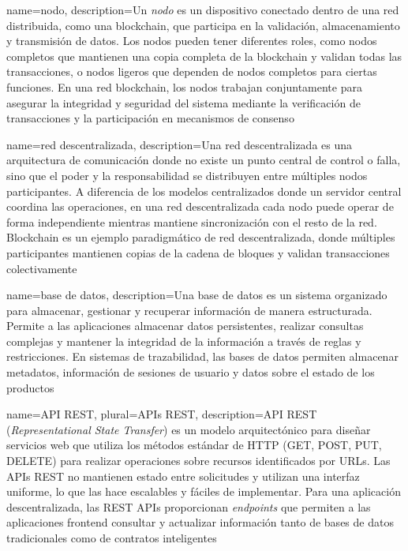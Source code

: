 {
    name=nodo,
    description={Un \textit{nodo} es un dispositivo conectado dentro de una red distribuida, como una blockchain, que participa en la validación, almacenamiento y transmisión de datos. Los nodos pueden tener diferentes roles, como nodos completos que mantienen una copia completa de la blockchain y validan todas las transacciones, o nodos ligeros que dependen de nodos completos para ciertas funciones. En una red blockchain, los nodos trabajan conjuntamente para asegurar la integridad y seguridad del sistema mediante la verificación de transacciones y la participación en mecanismos de consenso}
}

{
    name=red descentralizada,
    description={Una red descentralizada es una arquitectura de comunicación donde no existe un punto central de control o falla, sino que el poder y la responsabilidad se distribuyen entre múltiples nodos participantes. A diferencia de los modelos centralizados donde un servidor central coordina las operaciones, en una red descentralizada cada nodo puede operar de forma independiente mientras mantiene sincronización con el resto de la red. Blockchain es un ejemplo paradigmático de red descentralizada, donde múltiples participantes mantienen copias de la cadena de bloques y validan transacciones colectivamente}
}

{
    name=base de datos,
    description={Una base de datos es un sistema organizado para almacenar, gestionar y recuperar información de manera estructurada. Permite a las aplicaciones almacenar datos persistentes, realizar consultas complejas y mantener la integridad de la información a través de reglas y restricciones. En sistemas de trazabilidad, las bases de datos permiten almacenar metadatos, información de sesiones de usuario y datos sobre el estado de los productos}
}

{
    name=API REST,
    plural=APIs REST,
    description={API REST (\textit{Representational State Transfer}) es un modelo arquitectónico para diseñar servicios web que utiliza los métodos estándar de HTTP (GET, POST, PUT, DELETE) para realizar operaciones sobre recursos identificados por URLs. Las APIs REST no mantienen estado entre solicitudes y utilizan una interfaz uniforme, lo que las hace escalables y fáciles de implementar. Para una aplicación descentralizada, las REST APIs proporcionan \textit{endpoints} que permiten a las aplicaciones frontend consultar y actualizar información tanto de bases de datos tradicionales como de contratos inteligentes}
}

